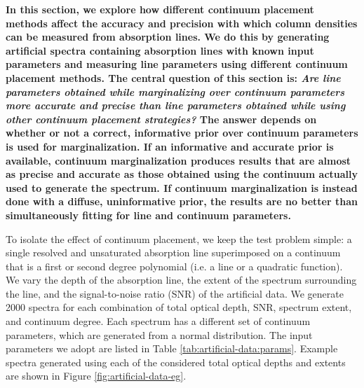 \documentclass[trackchanges]{aastex62}
\begin{document}
{ \bf
In this section, we explore how different continuum placement methods affect the accuracy and precision with which column densities can be measured from absorption lines.
We do this by generating artificial spectra containing absorption lines with known input parameters and measuring line parameters using different continuum placement methods.
The central question of this section is: \emph{Are line parameters obtained while marginalizing over continuum parameters more accurate and precise than line parameters obtained while using other continuum placement strategies?}
The answer depends on whether or not a correct, informative prior over continuum parameters is used for marginalization.
If an informative and accurate prior is available, continuum marginalization produces results that are almost as precise and accurate as those obtained using the continuum actually used to generate the spectrum.
If continuum marginalization is instead done with a diffuse, uninformative prior, the results are no better than simultaneously fitting for line and continuum parameters.

To isolate the effect of continuum placement, we keep the test problem simple: a single resolved and unsaturated absorption line superimposed on a continuum that is a first or second degree polynomial (i.e. a line or a quadratic function).
We vary the depth of the absorption line, the extent of the spectrum surrounding the line, and the signal-to-noise ratio (SNR) of the artificial data.
We generate 2000 spectra for each combination of total optical depth, SNR, spectrum extent, and continuum degree.
Each spectrum has a different set of continuum parameters, which are generated from a normal distribution.
The input parameters we adopt are listed in Table \ref{tab:artificial-data:params}.
Example spectra generated using each of the considered total optical depths and extents are shown in Figure \ref{fig:artificial-data-eg}.
}
\end{document}
